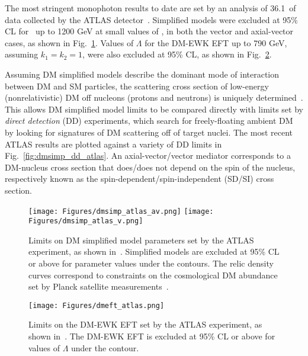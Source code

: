The most stringent monophoton results to date are set by an analysis of 36.1\fbinv\ of data collected by the ATLAS detector~\cite{ref:epjc/s10052-017-4965-8}.
Simplified models were excluded at 95\% CL for \mmed\ up to 1200 GeV at small values of \mdm, in both the vector and axial-vector cases, as shown in Fig.~\ref{fig:dmsimp_atlas}.
Values of $\Lambda$ for the DM-EWK EFT up to 790 GeV, assuming $k_{1} = k_{2} = 1$, were also excluded at 95\% CL, as shown in Fig.~\ref{fig:dmeft_atlas}.

Assuming DM simplified models describe the dominant mode of interaction between DM and SM particles, the scattering cross section of low-energy (nonrelativistic) DM off nucleons (protons and neutrons)
is uniquely determined~\cite{ref:1603.04156}. This allows DM simplified model limits to be compared directly with limits set by \textit{direct detection} (DD) experiments, which search for freely-floating
ambient DM by looking for signatures of DM scattering off of target nuclei.
The most recent ATLAS results are plotted against a variety of DD limits in Fig.~\ref{fig:dmsimp_dd_atlas}. An axial-vector/vector mediator corresponds to a DM-nucleus cross section
that does/does not depend on the spin of the nucleus, respectively known as the spin-dependent/spin-independent (SD/SI) cross section.

\begin{figure}[hbtb]
  \begin{center}
    \texttt{[image: Figures/dmsimp\_atlas\_av.png]}
    \texttt{[image: Figures/dmsimp\_atlas\_v.png]}
    \caption{Limits on DM simplified model parameters set by the ATLAS experiment, as shown in~\cite{ref:epjc/s10052-017-4965-8}. Simplified models are excluded at 95\% CL or above
    for parameter values under the contours. The relic density curves correspond to constraints on the cosmological DM abundance set by Planck satellite measurements~\cite{ref:planck2018_cosparams}.
    }
    \label{fig:dmsimp_atlas}
  \end{center}
\end{figure}

\begin{figure}[hbtb]
  \begin{center}
    \texttt{[image: Figures/dmeft\_atlas.png]}
    \caption{Limits on the DM-EWK EFT set by the ATLAS experiment, as shown in~\cite{ref:epjc/s10052-017-4965-8}. The DM-EWK EFT is excluded at 95\% CL or above for
    values of $\Lambda$ under the contour.
    }
    \label{fig:dmeft_atlas}
  \end{center}
\end{figure}

